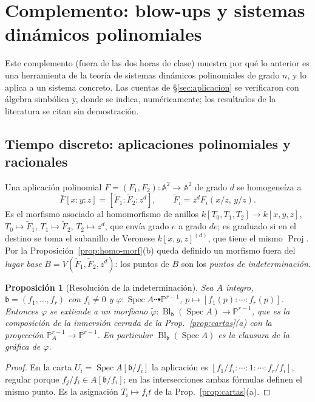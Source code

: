 \documentclass[11pt,a4paper]{article}
\newcommand{\Spec}{\operatorname{Spec}}
\newcommand{\Proj}{\operatorname{Proj}}
\newcommand{\Bl}{\operatorname{Bl}}
\newcommand{\A}{\mathbb{A}}
\newcommand{\PP}{\mathbb{P}}
\theoremstyle{plain}
\newtheorem{proposicion}[teorema]{Proposición}
\theoremstyle{definition}
\theoremstyle{remark}
\begin{document}
\section{Complemento: blow-ups y sistemas dinámicos polinomiales}\label{sec:dinamica}

Este complemento (fuera de las dos horas de clase) muestra por qué lo anterior es una herramienta de la teoría de sistemas dinámicos polinomiales de grado $n$, y lo aplica a un sistema concreto. Las cuentas de \S\ref{sec:aplicacion} se verificaron con álgebra simbólica y, donde se indica, numéricamente; los resultados de la literatura se citan sin demostración.

\subsection{Tiempo discreto: aplicaciones polinomiales y racionales}

Una aplicación polinomial $F=(F_1,F_2)\colon\A^2\to\A^2$ de grado $d$ se homogeneíza a
\[
\bar F[x:y:z]=[\tilde F_1:\tilde F_2:z^d],\qquad \tilde F_i=z^dF_i(x/z,\,y/z).
\]
Es el morfismo asociado al homomorfismo de anillos $k[T_0,T_1,T_2]\to k[x,y,z]$, $T_0\mapsto\tilde F_1$, $T_1\mapsto\tilde F_2$, $T_2\mapsto z^d$, que envía grado $e$ a grado $de$; es graduado si en el destino se toma el subanillo de Veronese $k[x,y,z]^{(d)}$, que tiene el mismo $\Proj$. Por la Proposición~\ref{prop:homo-morf}(b) queda definido un morfismo fuera del \emph{lugar base} $B=V(\tilde F_1,\tilde F_2,z^d)$: los puntos de $B$ son los \emph{puntos de indeterminación}.

\begin{proposicion}[Resolución de la indeterminación]\label{prop:indet}
Sea $A$ íntegro, $\mathfrak b=(f_1,\dots,f_r)$ con $f_i\ne0$ y $\varphi\colon\Spec A\dashrightarrow\PP^{r-1}$, $p\mapsto[f_1(p):\cdots:f_r(p)]$. Entonces $\varphi$ se extiende a un morfismo $\tilde\varphi\colon\Bl_{\mathfrak b}(\Spec A)\to\PP^{r-1}$, que es la composición de la inmersión cerrada de la Prop.~\ref{prop:cartas}(a) con la proyección $\PP^{r-1}_A\to\PP^{r-1}$. En particular $\Bl_{\mathfrak b}(\Spec A)$ es la clausura de la gráfica de $\varphi$.
\end{proposicion}

\begin{proof}
En la carta $U_i=\Spec A[\mathfrak b/f_i]$ la aplicación es $[f_1/f_i:\cdots:1:\cdots:f_r/f_i]$, regular porque $f_j/f_i\in A[\mathfrak b/f_i]$; en las intersecciones ambas fórmulas definen el mismo punto. Es la asignación $T_i\mapsto f_it$ de la Prop.~\ref{prop:cartas}(a).
\end{proof}
\end{document}
